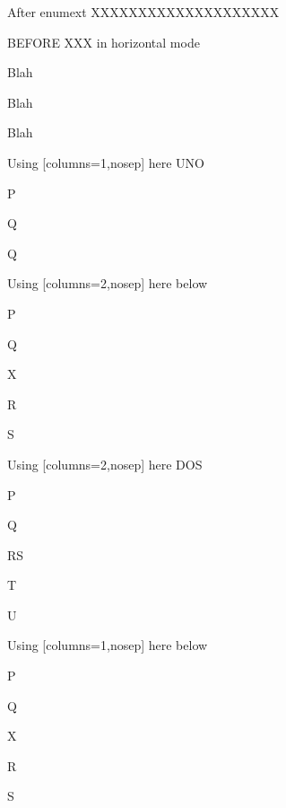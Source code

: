 \documentclass[10pt]{article}
\begin{document}
After enumext XXXXXXXXXXXXXXXXXXXX






BEFORE XXX in horizontal mode

\begin{enumext}[columns=2,nosep,label={(\arabic*.)}]%

   \item\label{1} Blah %
   \item\label{2} Blah %
   \item\label{3} Blah

\item Using [columns=1,nosep] here UNO \label{test}

  \begin{enumext}[columns=1,nosep,label=\arabic{enumXi}.(\alph*)]%
     \item  P \item Q \item Q
  \end{enumext}

\item Using [columns=2,nosep] here below
\begin{enumext}[columns=1,nosep]%
     \item  P \item Q \item X  \item R \item S
  \end{enumext}

\columnbreak

\item Using [columns=2,nosep] here DOS
  \begin{enumext}[columns=2,nosep]%
    \item  P \item Q \item RS \item T \item U
  \end{enumext}

\item Using [columns=1,nosep] here below
\begin{enumext}[columns=1,nosep]%
     \item  P \item Q \item X  \item R \item S
  \end{enumext}

\end{enumext}
\end{document}
